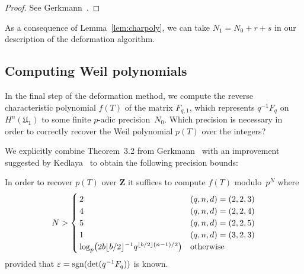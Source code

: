 \begin{proof} 
See Gerkmann~\citep[Lemma~3.3, Lemma~3.4]{Gerkmann2007}.
\end{proof}

\begin{defn}
As a consequence of Lemma~\ref{lem:charpoly}, we can take 
$N_1 = N_0 + r + s$ in our description of the deformation 
algorithm.
\end{defn}

\subsection{Computing Weil polynomials}

In the final step of the deformation method, we compute the 
reverse characteristic polynomial $f(T)$ of the matrix $F_{q,1}$, 
which represents $q^{-1} F_q$ on $H^n(\mathfrak{U}_1)$ to some finite 
$p$-adic precision~$N_0$.  Which precision is necessary in order to 
correctly recover the Weil polynomial $p(T)$ over the integers?

We explicitly combine Theorem~{3.2} from Gerkmann~\citep{Gerkmann2007} 
with an improvement suggested by Kedlaya~\citep[Lemma~1.2.3]{Kedlaya2011}
to obtain the following precision bounds:

\begin{thm}
In order to recover $p(T)$ over $\mathbf{Z}$ it suffices to compute 
$f(T)$ modulo~$p^N$ where 
\begin{equation*}
N > \begin{cases}
    2 & (q,n,d) = (2,2,3) \\
    4 & (q,n,d) = (2,2,4) \\
    5 & (q,n,d) = (2,2,5) \\
    1 & (q,n,d) = (3,2,3) \\
    \log_p \bigl( 2 b \lfloor b/2\rfloor^{-1} q^{\left\lfloor b/2\right\rfloor (n - 1) / 2} \bigr) & \text{otherwise}
    \end{cases}
\end{equation*}
provided that $\varepsilon = \operatorname{sgn}(\det(q^{-1} F_q))$ is known.
\end{thm}

